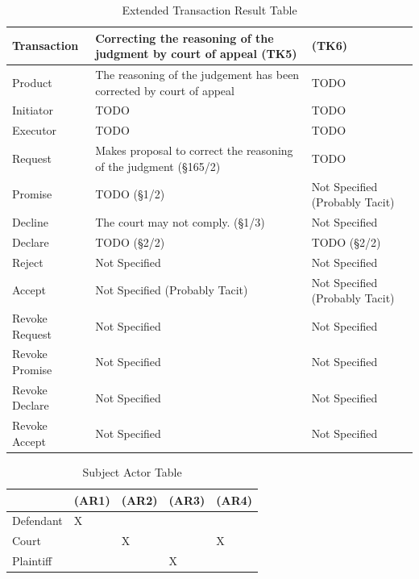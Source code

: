 \begin{landscape}
\begin{table}[h]
\caption{Extended Transaction Result Table}
\label{tab:etrt}
\begin{tabular}{|l||l|l|}
\hline
Transaction  & Correcting the reasoning of the judgment by court of appeal  (TK5) &  (TK6) \\ \hline
Product      & The reasoning of the judgement has been corrected by court of appeal  & TODO \\ \hline
Initiator      &  TODO   &  TODO\\ \hline
Executor       &  TODO &  TODO       \\ \hline
Request        & Makes proposal to correct the reasoning of the judgment (\S165/2)  & TODO  \\ \hline
Promise        &  TODO  (\S1/2)  &  Not Specified (Probably Tacit)   \\ \hline
Decline        &  The court may not comply. (\S1/3)  & Not Specified  \\ \hline
Declare        & TODO (\S2/2) & TODO (\S2/2) \\ \hline
Reject         &  Not Specified             &  Not Specified   \\ \hline
Accept         & Not Specified (Probably Tacit) &  Not Specified (Probably Tacit) \\ \hline
Revoke Request & Not Specified                   & Not Specified        \\ \hline
Revoke Promise & Not Specified                   &  Not Specified       \\ \hline
Revoke Declare & Not Specified                    &  Not Specified      \\ \hline
Revoke Accept  &  Not Specified             &   Not Specified             \\ \hline
\end{tabular}
\end{table}

\begin{table}[h]
\caption{Subject Actor Table}
\label{tab:subjectactortable}
\begin{tabular}{|l|l|l|l|l|}
\hline
  & (AR1)  &  (AR2)  &  (AR3) & (AR4)  \\ \hline
Defendant & X  &  &  &  \\ \hline
Court &  & X &  & X \\ \hline
Plaintiff &  &  & X & \\ \hline


\end{tabular}
\end{table}

\end{landscape}

